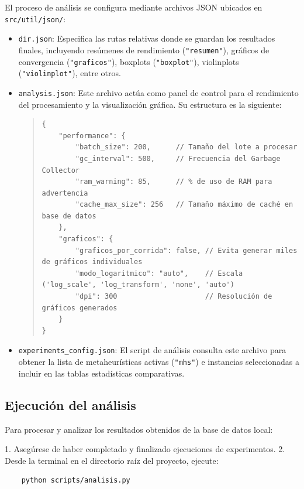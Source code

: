 El proceso de análisis se configura mediante archivos JSON ubicados en \texttt{src/util/json/}:

\begin{itemize}
    \item \texttt{dir.json}: Especifica las rutas relativas donde se guardan los resultados finales, incluyendo resúmenes de rendimiento (\texttt{"resumen"}), gráficos de convergencia (\texttt{"graficos"}), boxplots (\texttt{"boxplot"}), violinplots (\texttt{"violinplot"}), entre otros.
    
    \item \texttt{analysis.json}: Este archivo actúa como panel de control para el rendimiento del procesamiento y la visualización gráfica. Su estructura es la siguiente:
    \begin{quote}
    \begin{verbatim}
{
    "performance": {
        "batch_size": 200,      // Tamaño del lote a procesar
        "gc_interval": 500,     // Frecuencia del Garbage Collector
        "ram_warning": 85,      // % de uso de RAM para advertencia
        "cache_max_size": 256   // Tamaño máximo de caché en base de datos
    },
    "graficos": {
        "graficos_por_corrida": false, // Evita generar miles de gráficos individuales
        "modo_logaritmico": "auto",    // Escala ('log_scale', 'log_transform', 'none', 'auto')
        "dpi": 300                     // Resolución de gráficos generados
    }
}
    \end{verbatim}
    \end{quote}
    
    \item \texttt{experiments\_config.json}: El script de análisis consulta este archivo para obtener la lista de metaheurísticas activas (\texttt{"mhs"}) e instancias seleccionadas a incluir en las tablas estadísticas comparativas.
\end{itemize}

\subsection{Ejecución del análisis}

Para procesar y analizar los resultados obtenidos de la base de datos local:

1. Asegúrese de haber completado y finalizado ejecuciones de experimentos.
2. Desde la terminal en el directorio raíz del proyecto, ejecute:
    \begin{verbatim}
    python scripts/analisis.py
    \end{verbatim}


